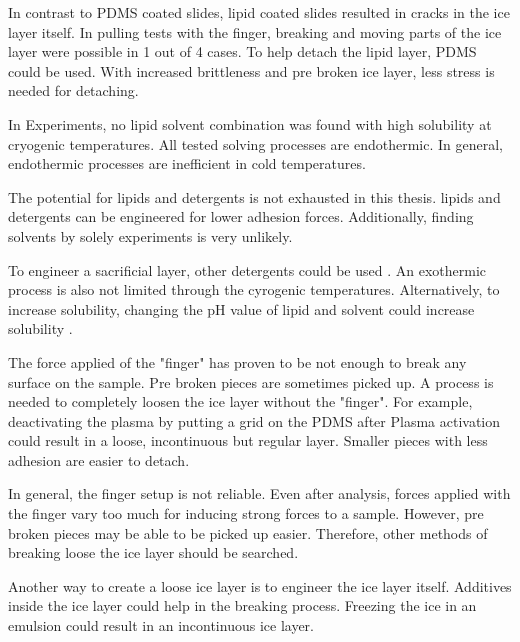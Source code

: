 In contrast to PDMS coated slides, lipid coated slides resulted in cracks in the ice layer itself. In pulling tests with the finger, breaking and moving parts of the ice layer were possible in 1 out of 4 cases. To help detach the lipid layer, PDMS could be used. With increased brittleness and pre broken ice layer, less stress is needed for detaching.

In Experiments, no lipid solvent combination was found with high solubility at cryogenic temperatures. All tested solving processes are endothermic. In general, endothermic processes are inefficient in cold temperatures.

The potential for lipids and detergents is not exhausted in this thesis. lipids and detergents can be engineered for lower adhesion forces. Additionally, finding solvents by solely experiments is very unlikely. 

To engineer a sacrificial layer, other detergents could be used \cite{SigmaAldrich.2023}. An exothermic process is also not limited through the cyrogenic temperatures. Alternatively, to increase solubility, changing the pH value of lipid and solvent could increase solubility \cite{BruceA.AverillPatriciaEldredge.}.

The force applied of the "finger" has proven to be not enough to break any surface on the sample. Pre broken pieces are sometimes picked up. A process is needed to completely loosen the ice layer without the "finger". For example, deactivating the plasma by putting a grid on the PDMS after Plasma activation could result in a loose, incontinuous but regular layer. Smaller pieces with less adhesion are easier to detach.

In general, the finger setup is not reliable. Even after analysis, forces applied with the finger vary too much for inducing strong forces to a sample. However, pre broken pieces may be able to be picked up easier. Therefore, other methods of breaking loose the ice layer should be searched.

Another way to create a loose ice layer is to engineer the ice layer itself. Additives inside the ice layer could help in the breaking process. Freezing the ice in an emulsion could result in an incontinuous ice layer. 

